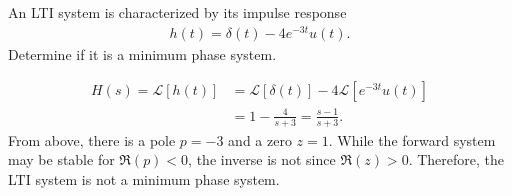 \documentclass{report}
\begin{document}
\begin{example}
    An LTI system is characterized by its impulse response 
    \begin{align*}
        h(t) = \delta(t) - 4e^{-3t}u(t).
    \end{align*}
    Determine if it is a minimum phase system.
\end{example}
\begin{solution}
    \begin{align*}
        H(s) = \mathcal{L}[h(t)] &= \mathcal{L}[\delta(t)] - 4 \mathcal{L}[e^{-3t}u(t)] \\ 
        &= 1 - \frac{4}{s+3} = \frac{s-1}{s+3}.
    \end{align*}
    From above, there is a pole $p=-3$ and a zero $z=1$. While the forward system may be stable for $\Re(p)<0$, the inverse is not since 
    $\Re(z)>0$. Therefore, the LTI system is not a minimum phase system.
\end{solution}
\end{document}
